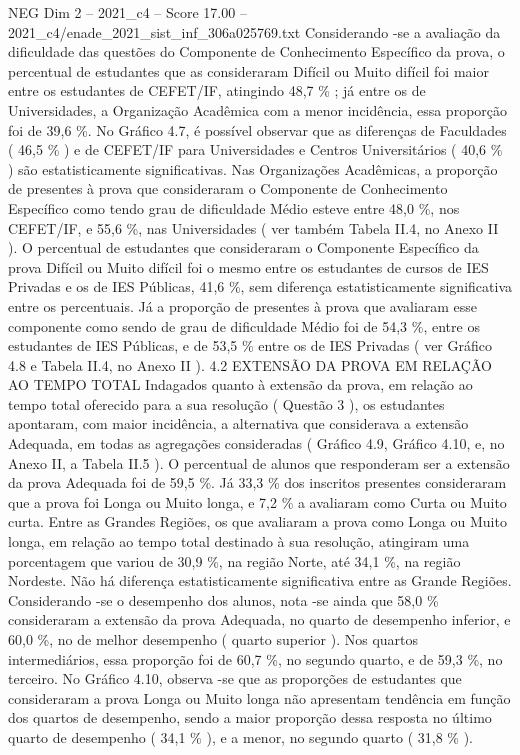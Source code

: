 \begin{textsample}{NEG Dim 2 – 2021\_c4 – Score 17.00 – 2021\_c4/enade\_2021\_sist\_inf\_306a025769.txt}
Considerando -se a avaliação da dificuldade das questões do Componente de Conhecimento Específico da prova, o percentual de estudantes que as consideraram Difícil ou Muito difícil foi maior entre os estudantes de CEFET/IF, atingindo 48,7 \% ; já entre os de Universidades, a Organização Acadêmica com a menor incidência, essa proporção foi de 39,6 \%.
No Gráfico 4.7, é possível observar que as diferenças de Faculdades ( 46,5 \% ) e de CEFET/IF para Universidades e Centros Universitários ( 40,6 \% ) são estatisticamente significativas.
Nas Organizações Acadêmicas, a proporção de presentes à prova que consideraram o Componente de Conhecimento Específico como tendo grau de dificuldade Médio esteve entre 48,0 \%, nos CEFET/IF, e 55,6 \%, nas Universidades ( ver também Tabela II.4, no Anexo II ).
O percentual de estudantes que consideraram o Componente Específico da prova Difícil ou Muito difícil foi o mesmo entre os estudantes de cursos de IES Privadas e os de IES Públicas, 41,6 \%, sem diferença estatisticamente significativa entre os percentuais.
Já a proporção de presentes à prova que avaliaram esse componente como sendo de grau de dificuldade Médio foi de 54,3 \%, entre os estudantes de IES Públicas, e de 53,5 \% entre os de IES Privadas ( ver Gráfico 4.8 e Tabela II.4, no Anexo II ). 4.2 EXTENSÃO DA PROVA EM RELAÇÃO AO TEMPO TOTAL Indagados quanto à extensão da prova, em relação ao tempo total oferecido para a sua resolução ( Questão 3 ), os estudantes apontaram, com maior incidência, a alternativa que considerava a extensão Adequada, em todas as agregações consideradas ( Gráfico 4.9, Gráfico 4.10, e, no Anexo II, a Tabela II.5 ).
O percentual de alunos que responderam ser a extensão da prova Adequada foi de 59,5 \%.
Já 33,3 \% dos inscritos presentes consideraram que a prova foi Longa ou Muito longa, e 7,2 \% a avaliaram como Curta ou Muito curta.
Entre as Grandes Regiões, os que avaliaram a prova como Longa ou Muito longa, em relação ao tempo total destinado à sua resolução, atingiram uma porcentagem que variou de 30,9 \%, na região Norte, até 34,1 \%, na região Nordeste.
Não há diferença estatisticamente significativa entre as Grande Regiões.
Considerando -se o desempenho dos alunos, nota -se ainda que 58,0 \% consideraram a extensão da prova Adequada, no quarto de desempenho inferior, e 60,0 \%, no de melhor desempenho ( quarto superior ).
Nos quartos intermediários, essa proporção foi de 60,7 \%, no segundo quarto, e de 59,3 \%, no terceiro.
No Gráfico 4.10, observa -se que as proporções de estudantes que consideraram a prova Longa ou Muito longa não apresentam tendência em função dos quartos de desempenho, sendo a maior proporção dessa resposta no último quarto de desempenho ( 34,1 \% ), e a menor, no segundo quarto ( 31,8 \% ).

\end{textsample}
